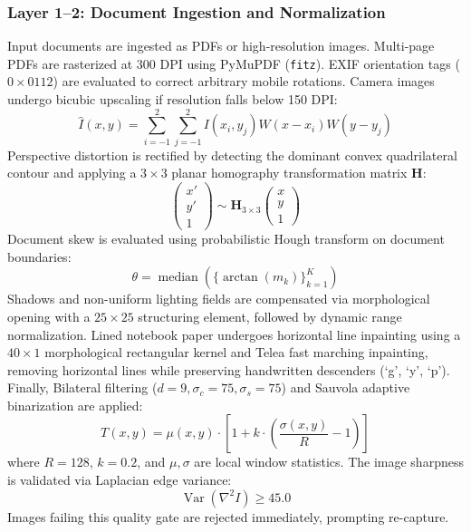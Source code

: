 \documentclass[journal]{IEEEtran}
\begin{document}
\subsubsection{Layer 1--2: Document Ingestion and Normalization}
Input documents are ingested as PDFs or high-resolution images. Multi-page PDFs are rasterized at 300 DPI using PyMuPDF (\texttt{fitz}). EXIF orientation tags ($0\times 0112$) are evaluated to correct arbitrary mobile rotations. Camera images undergo bicubic upscaling if resolution falls below 150 DPI:
\begin{equation}
    \hat{I}(x, y) = \sum_{i=-1}^{2} \sum_{j=-1}^{2} I(x_i, y_j) W(x - x_i) W(y - y_j)
\end{equation}
Perspective distortion is rectified by detecting the dominant convex quadrilateral contour and applying a $3 \times 3$ planar homography transformation matrix $\mathbf{H}$:
\begin{equation}
    \begin{pmatrix} x' \\ y' \\ 1 \end{pmatrix} \sim \mathbf{H}_{3 \times 3} \begin{pmatrix} x \\ y \\ 1 \end{pmatrix}
\end{equation}
Document skew is evaluated using probabilistic Hough transform on document boundaries:
\begin{equation}
    \theta = \operatorname{median}(\{\arctan(m_k)\}_{k=1}^K)
\end{equation}
Shadows and non-uniform lighting fields are compensated via morphological opening with a $25 \times 25$ structuring element, followed by dynamic range normalization. Lined notebook paper undergoes horizontal line inpainting using a $40 \times 1$ morphological rectangular kernel and Telea fast marching inpainting, removing horizontal lines while preserving handwritten descenders (`g', `y', `p'). Finally, Bilateral filtering ($d=9, \sigma_c=75, \sigma_s=75$) and Sauvola adaptive binarization are applied:
\begin{equation}
    T(x, y) = \mu(x, y) \cdot \left[1 + k \cdot \left(\frac{\sigma(x, y)}{R} - 1\right)\right]
\end{equation}
where $R=128$, $k=0.2$, and $\mu, \sigma$ are local window statistics. The image sharpness is validated via Laplacian edge variance:
\begin{equation}
    \operatorname{Var}(\nabla^2 I) \ge 45.0
\end{equation}
Images failing this quality gate are rejected immediately, prompting re-capture.
\end{document}
